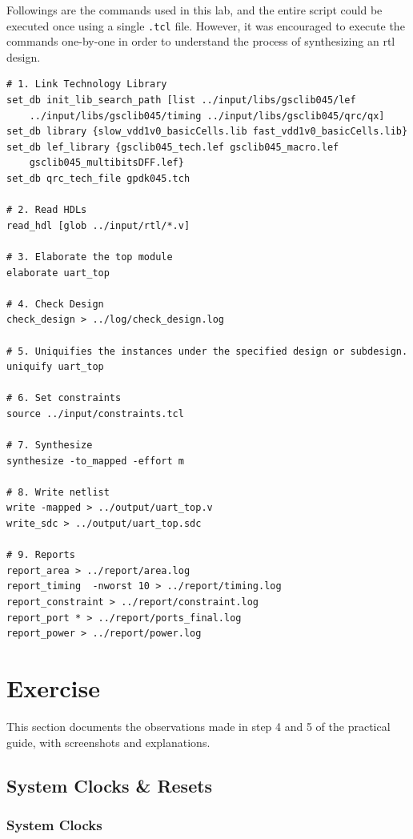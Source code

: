 \documentclass[a4paper,11pt]{article}%
\begin{document}
Followings are the commands used in this lab, and the entire script could be executed once using a single {\tt .tcl} file. However, it was encouraged to execute the commands one-by-one in order to understand the process of synthesizing an \ac{rtl} design.
\vspace{2cm}
\begin{Verbatim}[frame=single]
# 1. Link Technology Library
set_db init_lib_search_path [list ../input/libs/gsclib045/lef
    ../input/libs/gsclib045/timing ../input/libs/gsclib045/qrc/qx]
set_db library {slow_vdd1v0_basicCells.lib fast_vdd1v0_basicCells.lib}
set_db lef_library {gsclib045_tech.lef gsclib045_macro.lef
    gsclib045_multibitsDFF.lef}
set_db qrc_tech_file gpdk045.tch

# 2. Read HDLs
read_hdl [glob ../input/rtl/*.v]

# 3. Elaborate the top module
elaborate uart_top

# 4. Check Design
check_design > ../log/check_design.log

# 5. Uniquifies the instances under the specified design or subdesign.
uniquify uart_top

# 6. Set constraints
source ../input/constraints.tcl

# 7. Synthesize 
synthesize -to_mapped -effort m

# 8. Write netlist
write -mapped > ../output/uart_top.v
write_sdc > ../output/uart_top.sdc

# 9. Reports
report_area > ../report/area.log
report_timing  -nworst 10 > ../report/timing.log
report_constraint > ../report/constraint.log
report_port * > ../report/ports_final.log
report_power > ../report/power.log
\end{Verbatim}

\pagebreak
\section{Exercise}
This section documents the observations made in step 4 and 5 of the practical guide, with screenshots and explanations.\\


\subsection{System Clocks \& Resets}

\subsubsection{System Clocks}
\end{document}
